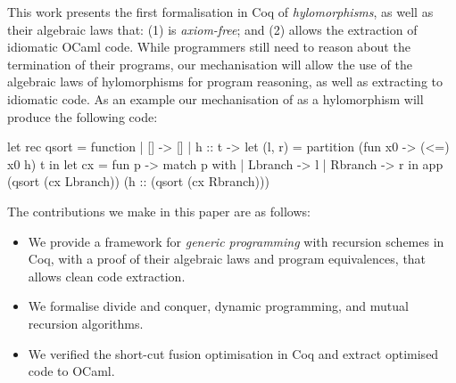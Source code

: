 \documentclass[ a4paper, UKenglish, cleveref, autoref, thm-restate]{lipics-v2021}
\newcommand{\cata}[1]{\lbans #1 \rbans}
\newcommand{\ana}[1]{\llens #1 \rlens}
\newcommand{\comp}{\cdot}
\newcommand{\operator}[1]{\textsf{#1}}
\newcommand{\InOp}{\operator{in}^{\circ}}
\newcommand{\OutOp}{\operator{out}^{\circ}}
\begin{document}
This work presents the first formalisation in Coq of \emph{hylomorphisms}, as
well as their algebraic laws that: (1) is \emph{axiom-free}; and (2)
allows the extraction of idiomatic OCaml code. While programmers
still need to reason about the termination of their programs, our mechanisation
will allow the use of the algebraic laws of hylomorphisms for program
reasoning, as well as extracting to idiomatic code. As an
example our mechanisation of  as a hylomorphism will produce
the following code:
\begin{coqcode}
let rec qsort = function | [] -> []
  | h :: t -> let (l, r) = partition (fun x0 -> (<=) x0 h) t in
              let cx = fun p -> match p with | Lbranch -> l | Rbranch -> r in 
              app (qsort (cx Lbranch)) (h :: (qsort (cx Rbranch)))
\end{coqcode}
The contributions we make in this paper are as follows:
\begin{itemize}
  \item We provide a framework for \emph{generic programming} with recursion
    schemes in Coq, with a proof of their algebraic laws and 
    program equivalences, that allows clean code extraction.
  \item We formalise divide and conquer, dynamic programming, and
    mutual recursion algorithms.
  \item We verified the short-cut fusion optimisation in Coq and
    extract optimised code to OCaml.
\end{itemize}

\end{document}
